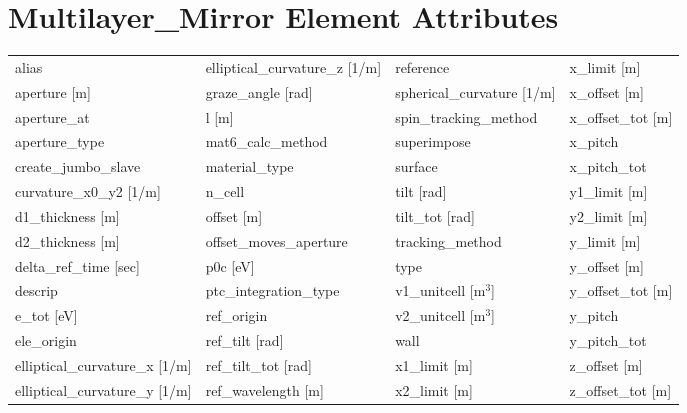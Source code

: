  \section{Multilayer_Mirror Element Attributes}
 \label{s:list.multilayer.mirror}
 
 \begin{tabular}{llll} \toprule
alias                            & elliptical_curvature_z [1/m]     & reference                        & x_limit [m]                      \\
aperture [m]                     & graze_angle [rad]                & spherical_curvature [1/m]        & x_offset [m]                     \\
aperture_at                      & l [m]                            & spin_tracking_method             & x_offset_tot [m]                 \\
aperture_type                    & mat6_calc_method                 & superimpose                      & x_pitch                          \\
create_jumbo_slave               & material_type                    & surface                          & x_pitch_tot                      \\
curvature_x0_y2 [1/m]            & n_cell                           & tilt [rad]                       & y1_limit [m]                     \\
d1_thickness [m]                 & offset [m]                       & tilt_tot [rad]                   & y2_limit [m]                     \\
d2_thickness [m]                 & offset_moves_aperture            & tracking_method                  & y_limit [m]                      \\
delta_ref_time [sec]             & p0c [eV]                         & type                             & y_offset [m]                     \\
descrip                          & ptc_integration_type             & v1_unitcell [m$^3$]              & y_offset_tot [m]                 \\
e_tot [eV]                       & ref_origin                       & v2_unitcell [m$^3$]              & y_pitch                          \\
ele_origin                       & ref_tilt [rad]                   & wall                             & y_pitch_tot                      \\
elliptical_curvature_x [1/m]     & ref_tilt_tot [rad]               & x1_limit [m]                     & z_offset [m]                     \\
elliptical_curvature_y [1/m]     & ref_wavelength [m]               & x2_limit [m]                     & z_offset_tot [m]                 \\
 \bottomrule
 \end{tabular}
 \vfill
 
